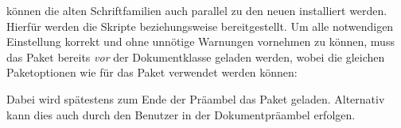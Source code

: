 \begin{Bundle*}[v2.05]{}
{   können die alten Schriftfamilien auch parallel zu 
  den neuen installiert werden. Hierfür werden die Skripte
  beziehungsweise
  bereitgestellt.
}%
%
Um alle notwendigen Einstellung korrekt und ohne unnötige Warnungen vornehmen 
zu können, muss das Paket  bereits \emph{vor} der 
Dokumentklasse geladen werden, wobei die gleichen Paketoptionen wie für das 
Paket  verwendet werden können:
%
%
Dabei wird spätestens zum Ende der Präambel das Paket  
geladen. Alternativ kann dies auch durch den Benutzer in der Dokumentpräambel 
erfolgen.
\end{Bundle*}


